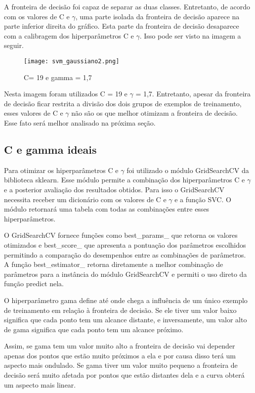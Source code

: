 \documentclass[12pt]{article}
\begin{document}
A fronteira de decisão foi capaz de separar as duas classes. Entretanto, de acordo com os valores de C e $\gamma$, uma parte isolada da fronteira de decisão aparece na parte inferior direita do gráfico. Esta parte da fronteira de decisão desaparece com a calibragem dos hiperparâmetros C e $\gamma$. Isso pode ser visto na imagem a seguir.

\begin{figure} [htp]
\begin{center}
\texttt{[image: svm\_gaussiano2.png]}
\caption{C= 19 e gamma = 1,7} \label{svm_gaussiano_2}
\end{center}
\end{figure}

Nesta imagem foram utilizados C = 19 e $\gamma$ = 1,7. Entretanto, apesar da fronteira de decisão ficar restrita a divisão dos dois grupos de exemplos de treinamento, esses valores de C e $\gamma$ não são os que melhor otimizam a fronteira de decisão. Esse fato será melhor analisado na próxima seção.

\subsection{C e gamma ideais}

Para otimizar os hiperparâmetros C e $\gamma$ foi utilizado o módulo GridSearchCV da biblioteca sklearn. Esse módulo permite a combinação dos hiperparâmetros C e $\gamma$ e a posterior avaliação dos resultados obtidos. Para isso o GridSearchCV necessita receber um dicionário com os valores de C e $\gamma$ e a função SVC. O módulo retornará uma tabela com todas as combinações entre esses hiperparâmetros. 

O GridSearchCV fornece funções como best\_params\_ que retorna os valores otimizados e best\_score\_ que apresenta a pontuação dos parâmetros escolhidos permitindo a comparação do desempenhos entre as combinações de parâmetros. A função best\_estimator\_ retorna diretamente a melhor combinação de parâmetros para a instância do módulo GridSearchCV e permiti o uso direto da função predict nela.

O hiperparâmetro gama define até onde chega a influência de um único exemplo de treinamento em relação à fronteira de decisão. Se ele tiver um valor baixo significa que cada ponto tem um alcance distante, e inversamente, um valor alto de gama significa que cada ponto tem um alcance próximo.

Assim, se gama tem um valor muito alto a fronteira de decisão vai depender apenas dos pontos que estão muito próximos a ela e por causa disso terá um aspecto mais ondulado. Se gama tiver um valor muito pequeno a fronteira de decisão será muito afetada por pontos que estão distantes dela e a curva obterá um aspecto mais linear. 
\end{document}
